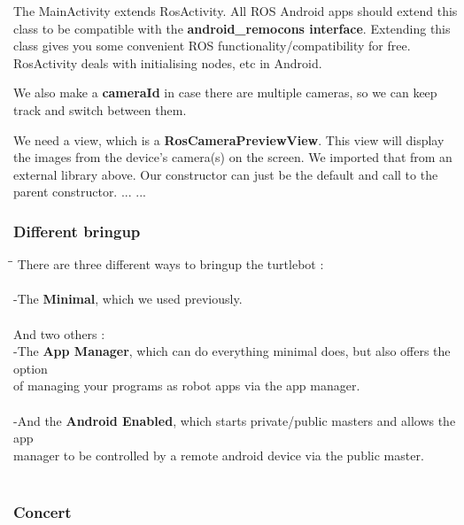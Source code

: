 \documentclass[10pt,a4paper]{article}
\begin{document}
The MainActivity extends RosActivity. All ROS Android apps should extend this class to be compatible with the \textbf{android\_remocons interface}. Extending this class gives you some convenient ROS functionality/compatibility for free. RosActivity deals with initialising nodes, etc in Android.

We also make a \textbf{cameraId} in case there are multiple cameras, so we can keep track and switch between them. 

We need a view, which is a \textbf{RosCameraPreviewView}. This view will display the images from the device's camera(s) on the screen. We imported that from an external library above. Our constructor can just be the default and call to the parent constructor.
... ...

\subsubsection{Different bringup}

\begin{tabbing}
\hspace{1cm}\=\hspace{1cm}\=\kill
There are three different ways to bringup the turtlebot :\\\\

\> -The \textbf{Minimal}, which we used previously.\\\\



 And two others : \\
\> -The \textbf{App Manager}, which can do everything minimal does, but also offers the option \\ of managing your programs as robot apps via the app manager.\\\\

\> -And the \textbf{Android Enabled}, which starts private/public masters and allows the app \\ manager to be controlled by a remote android device via the public master.\\\\
\end{tabbing}

\subsubsection{Concert}
\end{document}
